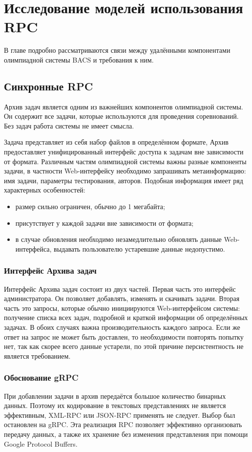 \chapter{Исследование моделей использования RPC}
В главе подробно рассматриваются связи между удалёнными компонентами
олимпиадной системы BACS и требования к ним.

\section{Синхронные RPC}
Архив задач является одним из важнейших компонентов олимпиадной системы.
Он содержит все задачи, которые используются для проведения соревнований.
Без задач работа системы не имеет смысла.

Задача представляет из себя набор файлов в определённом формате,
Архив предоставляет унифицированный интерфейс доступа к задачам
вне зависимости от формата. Различным частям олимпиадной системы важны
разные компоненты задачи, в частности Web-интерфейсу необходимо запрашивать
метаинформацию: имя задачи, параметры тестирования, авторов. Подобная
информация имеет ряд характерных особенностей:
\begin{itemize}
    \item размер сильно ограничен, обычно до 1 мегабайта;
    \item присутствует у каждой задачи вне зависимости от формата;
    \item в случае обновления необходимо незамедлительно обновлять
        данные Web-интерфейса, выдавать пользователю устаревшие данные
        недопустимо.
\end{itemize}

\subsection{Интерфейс Архива задач}
Интерфейс Архива задач состоит из двух частей. Первая часть это интерфейс
администратора. Он позволяет добавлять, изменять и скачивать задачи.
Вторая часть это запросы, которые обычно инициируются Web-интерфейсом
системы: получение списка всех задач, подробной и краткой информации
об определённых задачах. В обоих случаях важна производительность каждого
запроса. Если же ответ на запрос не может быть доставлен, то необходимости
повторять попытку нет, так как скорее всего данные устарели, по этой причине
персистентность не является требованием.

\subsection{Обоснование gRPC}
При добавлении задачи в архив передаётся большое количество бинарных данных.
Поэтому их кодирование в текстовых представлениях не является эффективным,
XML-RPC или JSON-RPC применять не следует. Выбор был остановлен на gRPC.
Эта реализация RPC позволяет эффективно организовать передачу данных,
а также их хранение без изменения представления при помощи Google Protocol
Buffers.

